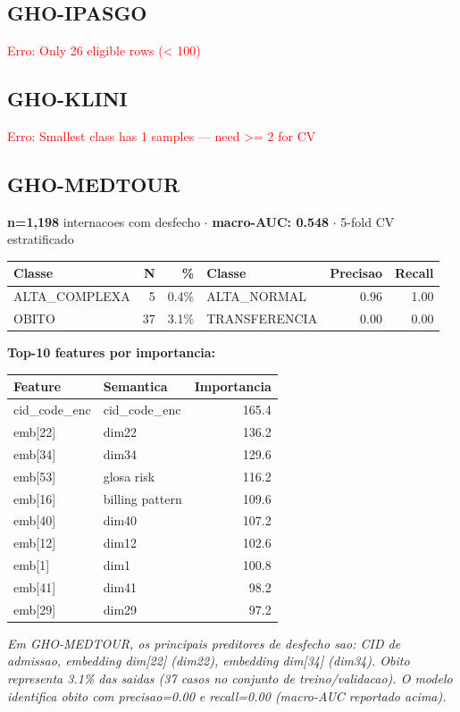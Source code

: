 \documentclass[11pt,a4paper]{article}
\begin{document}
\subsection{GHO-IPASGO}
\textcolor{red}{Erro: Only 26 eligible rows (< 100)}

\subsection{GHO-KLINI}
\textcolor{red}{Erro: Smallest class has 1 samples — need >= 2 for CV}

\subsection{GHO-MEDTOUR}
\textbf{n=1,198} internacoes com desfecho $\cdot$ \textbf{macro-AUC: 0.548} $\cdot$ 5-fold CV estratificado

\begin{tabular}{lrr|lrr}
\toprule
Classe & N & \% & Classe & Precisao & Recall \\
\midrule
ALTA\_COMPLEXA & 5 & 0.4\% & ALTA\_NORMAL & 0.96 & 1.00 \\
OBITO & 37 & 3.1\% & TRANSFERENCIA & 0.00 & 0.00 \\
\bottomrule
\end{tabular}

\vspace{4pt}\noindent\textbf{Top-10 features por importancia:}

\begin{tabular}{llr}
\toprule
Feature & Semantica & Importancia \\
\midrule
cid\_code\_enc & cid\_code\_enc & 165.4 \\
emb[22] & dim22 & 136.2 \\
emb[34] & dim34 & 129.6 \\
emb[53] & glosa risk & 116.2 \\
emb[16] & billing pattern & 109.6 \\
emb[40] & dim40 & 107.2 \\
emb[12] & dim12 & 102.6 \\
emb[1] & dim1 & 100.8 \\
emb[41] & dim41 & 98.2 \\
emb[29] & dim29 & 97.2 \\
\bottomrule
\end{tabular}

\vspace{4pt}\noindent\textit{Em GHO-MEDTOUR, os principais preditores de desfecho sao: CID de admissao, embedding dim[22] (dim22), embedding dim[34] (dim34). Obito representa 3.1\% das saidas (37 casos no conjunto de treino/validacao). O modelo identifica obito com precisao=0.00 e recall=0.00 (macro-AUC reportado acima).}
\end{document}
